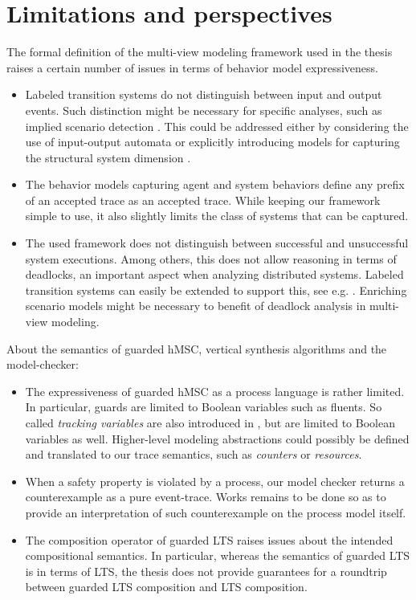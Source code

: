 \section{Limitations and perspectives\label{section:conclusion-limitations}}

The formal definition of the multi-view modeling framework used in the thesis raises a certain number of issues in terms of behavior model expressiveness.
\begin{itemize}

\item Labeled transition systems do not distinguish between input and output events. Such distinction might be necessary for specific analyses, such as implied scenario detection \cite{Letier:2005b}. This could be addressed either by considering the use of input-output automata \cite{Lynch:1987} or explicitly introducing models for capturing the structural system dimension \cite{Jackson:1995, Magee:1995}.

\item The behavior models capturing agent and system behaviors define any prefix of an accepted trace as an accepted trace. While keeping our framework simple to use, it also slightly limits the class of systems that can be captured.

\item The used framework does not distinguish between successful and unsuccessful system executions. Among others, this does not allow reasoning in terms of deadlocks, an important aspect when analyzing distributed systems. Labeled transition systems can easily be extended to support this, see e.g. \cite{Uchitel:2003}. Enriching scenario models might be necessary to benefit of deadlock analysis in multi-view modeling.

\end{itemize}

About the semantics of guarded hMSC, vertical synthesis algorithms and the model-checker:
\begin{itemize}

\item The expressiveness of guarded hMSC as a process language is rather limited. In particular, guards are limited to Boolean variables such as fluents. So called \emph{tracking  variables} are also introduced in \cite{Damas:2011}, but are limited to Boolean variables as well. Higher-level modeling abstractions could possibly be defined and translated to our trace semantics, such as \emph{counters} or \emph{resources}.

\item When a safety property is violated by a process, our model checker returns a counterexample as a pure event-trace. Works remains to be done so as to provide an interpretation of such counterexample on the process model itself. 

\item The composition operator of guarded LTS raises issues about the intended compositional semantics. In particular, whereas the semantics of guarded LTS is in terms of LTS, the thesis does not provide guarantees for a roundtrip between guarded LTS composition and LTS composition.

\end{itemize}

